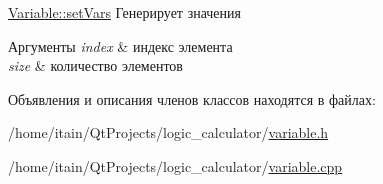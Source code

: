 \hyperlink{class_variable_ae6ac554c0382b43f9a3e37c6382d4471}{Variable\+::set\+Vars} Генерирует значения 


\begin{DoxyParams}{Аргументы}
{\em index} & индекс элемента \\
\hline
{\em size} & количество элементов \\
\hline
\end{DoxyParams}


Объявления и описания членов классов находятся в файлах\+:\begin{DoxyCompactItemize}
\item 
/home/itain/\+Qt\+Projects/logic\+\_\+calculator/\hyperlink{variable_8h}{variable.\+h}\item 
/home/itain/\+Qt\+Projects/logic\+\_\+calculator/\hyperlink{variable_8cpp}{variable.\+cpp}\end{DoxyCompactItemize}
